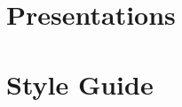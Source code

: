 \documentclass[twoside,10pt]{book}
\begin{document}
\chapter{Presentations}


\chapter{Style Guide}
\label{sec:styleguide}


\clearpage
{}
{} 
\printindex
\end{document}
